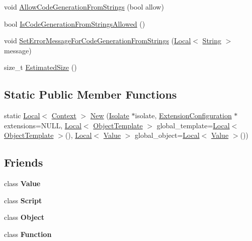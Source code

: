 \begin{DoxyCompactItemize}
\item 
void \hyperlink{classv8_1_1Context_a794ccc42113566f5d363f89c8b0d3c2c}{Allow\+Code\+Generation\+From\+Strings} (bool allow)
\item 
bool \hyperlink{classv8_1_1Context_aa7a960a232d232d1a2a904c2e6c18831}{Is\+Code\+Generation\+From\+Strings\+Allowed} ()
\item 
void \hyperlink{classv8_1_1Context_a8c919ccddb6fbb65602f7fe2587e8a34}{Set\+Error\+Message\+For\+Code\+Generation\+From\+Strings} (\hyperlink{classv8_1_1Local}{Local}$<$ \hyperlink{classv8_1_1String}{String} $>$ message)
\item 
size\+\_\+t \hyperlink{classv8_1_1Context_abfec90cb6cb1cac58b4e3487515721a2}{Estimated\+Size} ()
\end{DoxyCompactItemize}
\subsection*{Static Public Member Functions}
\begin{DoxyCompactItemize}
\item 
static \hyperlink{classv8_1_1Local}{Local}$<$ \hyperlink{classv8_1_1Context}{Context} $>$ \hyperlink{classv8_1_1Context_aee22d1422b0804b5b6bc0646bfd29af8}{New} (\hyperlink{classv8_1_1Isolate}{Isolate} $\ast$isolate, \hyperlink{classv8_1_1ExtensionConfiguration}{Extension\+Configuration} $\ast$extensions=N\+U\+LL, \hyperlink{classv8_1_1Local}{Local}$<$ \hyperlink{classv8_1_1ObjectTemplate}{Object\+Template} $>$ global\+\_\+template=\hyperlink{classv8_1_1Local}{Local}$<$ \hyperlink{classv8_1_1ObjectTemplate}{Object\+Template} $>$(), \hyperlink{classv8_1_1Local}{Local}$<$ \hyperlink{classv8_1_1Value}{Value} $>$ global\+\_\+object=\hyperlink{classv8_1_1Local}{Local}$<$ \hyperlink{classv8_1_1Value}{Value} $>$())
\end{DoxyCompactItemize}
\subsection*{Friends}
\begin{DoxyCompactItemize}
\item 
class {\bfseries Value}\hypertarget{classv8_1_1Context_aeceedf6e1a7d48a588516ce2b1983d6f}{}\label{classv8_1_1Context_aeceedf6e1a7d48a588516ce2b1983d6f}

\item 
class {\bfseries Script}\hypertarget{classv8_1_1Context_ae98eaa96d1b24e087f3c3e372fb09dce}{}\label{classv8_1_1Context_ae98eaa96d1b24e087f3c3e372fb09dce}

\item 
class {\bfseries Object}\hypertarget{classv8_1_1Context_a0720b5f434e636e22a3ed34f847eec57}{}\label{classv8_1_1Context_a0720b5f434e636e22a3ed34f847eec57}

\item 
class {\bfseries Function}\hypertarget{classv8_1_1Context_ab7194606aa12931e96f8f5448d418ed0}{}\label{classv8_1_1Context_ab7194606aa12931e96f8f5448d418ed0}

\end{DoxyCompactItemize}



